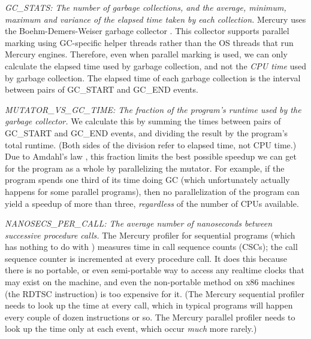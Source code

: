 
\emph{GC\_STATS: The number of garbage collections,
and the average, minimum, maximum and variance
of the elapsed time taken by each collection.}
Mercury uses the Boehm-Demers-Weiser garbage collector \citep{boehm:1988:gc}.
This collector supports parallel marking using GC-specific helper threads
rather than the OS threads that run Mercury engines.
Therefore, even when parallel marking is used,
we can only calculate the elapsed time used by garbage collection,
and not the \emph{CPU time} used by garbage collection.
The elapsed time of each garbage collection
is the interval between pairs of GC\_START and GC\_END events.

\emph{MUTATOR\_VS\_GC\_TIME:
The fraction of the program's runtime used by the garbage collector.}
We calculate this by summing the times
between pairs of GC\_START and GC\_END events,
and dividing the result by the program's total runtime.
(Both sides of the division refer to elapsed time, not CPU time.)
Due to Amdahl's law \citep{amdahl:1967:law},
this fraction limits the best possible speedup we can get
for the program as a whole by parallelizing the mutator.
For example, if the program spends one third of its time doing GC
(which unfortunately actually happens for some parallel programs),
then no parallelization of the program can yield a speedup of more than three,
\emph{regardless} of the number of CPUs available.

\emph{NANOSECS\_PER\_CALL:
The average number of nanoseconds between successive procedure calls.}
The Mercury profiler for sequential programs \citep{conway:2001:mercury-deep}
(which has nothing to do with \tscope)
measures time in call sequence counts (CSCs);
the call sequence counter is incremented at every procedure call.
It does this because there is no portable, or even semi-portable way
to access any realtime clocks that may exist on the machine,
and even the non-portable method on x86 machines (the RDTSC instruction)
is too expensive for it.
(The Mercury sequential profiler needs to look up the time at every call,
which in typical programs will happen every couple of dozen instructions or so.
The Mercury parallel profiler needs to look up the time only at each event,
which occur \emph{much} more rarely.)

